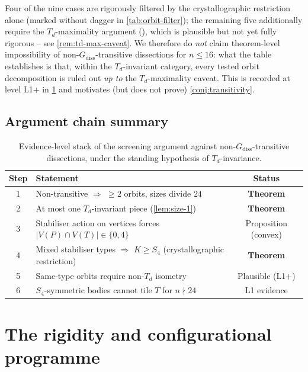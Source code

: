 \documentclass[11pt,a4paper]{article}
\theoremstyle{plain}
\theoremstyle{definition}
\theoremstyle{remark}
\newcommand{\Td}{T_{\!d}}
\begin{document}
\noindent
Four of the nine cases are rigorously filtered by the crystallographic
restriction alone (marked without dagger in \cref{tab:orbit-filter});
the remaining five additionally require the
$\Td$-maximality argument (), which is plausible but not
yet fully rigorous -- see \cref{rem:td-max-caveat}.  We therefore do
\emph{not} claim theorem-level impossibility of non-$G_{\mathrm{diss}}$-transitive
dissections for $n \leq 16$: what the table establishes is that, within
the $\Td$-invariant category, every tested orbit decomposition is ruled
out \emph{up to} the $\Td$-maximality caveat.  This is recorded at level
\textsf{L1+} in \cref{tab:argument-chain} and motivates (but does not
prove) \cref{conj:transitivity}.

\subsection{Argument chain summary}

\begin{table}[H]
\centering\small
\caption{Evidence-level stack of the screening argument against
non-$G_{\mathrm{diss}}$-transitive dissections, under the standing
hypothesis of $\Td$-invariance.}
\label{tab:argument-chain}
\begin{tabular}{@{} c l c @{}}
\toprule
Step & Statement & Status \\
\midrule
1 & Non-transitive $\Rightarrow$ $\geq 2$ orbits, sizes divide $24$       & \textbf{Theorem} \\
2 & At most one $\Td$-invariant piece (\cref{lem:size-1})                 & \textbf{Theorem} \\
3 & Stabiliser action on vertices forces $|V(P) \cap V(T)| \in \{0, 4\}$ & Proposition (convex) \\
4 & Mixed stabiliser types $\Rightarrow$ $K \geq S_{4}$
       (crystallographic restriction)                                      & \textbf{Theorem} \\
5 & Same-type orbits require non-$\Td$ isometry                          & Plausible (L1+) \\
6 & $S_{4}$-symmetric bodies cannot tile $T$ for $n \nmid 24$            & L1 evidence \\
\bottomrule
\end{tabular}
\end{table}

\section{The rigidity and configurational programme}\label{sec:programme}
\end{document}
